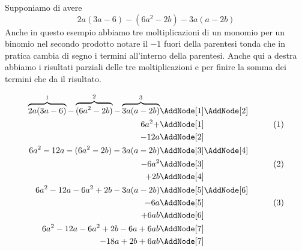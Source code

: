 \begin{esempio}
Supponiamo di avere \[2a(3a-6)-(6a^2-2b)-3a(a-2b)\]
Anche in questo esempio abbiamo tre moltiplicazioni di un monomio per un binomio nel secondo prodotto notare il $-1$ fuori della parentesi tonda che in pratica cambia di segno i termini all'interno della parentesi. Anche qui a destra abbiamo  i risultati parziali delle tre moltiplicazioni e per finire la somma dei termini che da il risultato.
\begin{NodesList}
	\begin{align*}
		\overbrace{2a(3a-6)}^{1}-\overbrace{(6a^2-2b)}^{2}-\overbrace{3a(a-2b)}^{3}&\AddNode[1]\AddNode[2]\\
		6a^2+&\AddNode[1]&\tag{1}\\ 
		-12a&\AddNode[2]&\\
		6a^2-12a-(6a^2-2b)-3a(a-2b)&\AddNode[3]\AddNode[4]\\
		-6a^2&\AddNode[3]&\tag{2}\\    
		+2b&\AddNode[4]&\\
		6a^2-12a-6a^2+2b-3a(a-2b)&\AddNode[5]\AddNode[6]\\
		-6a&\AddNode[5]&\tag{3}\\
		+6ab&\AddNode[6]&\\
		6a^2-12a-6a^2+2b-6a+6ab&\AddNode[7]\\   
		-18a+2b+6ab&\AddNode[7]   
	\end{align*}
\end{NodesList}
\end{esempio}
